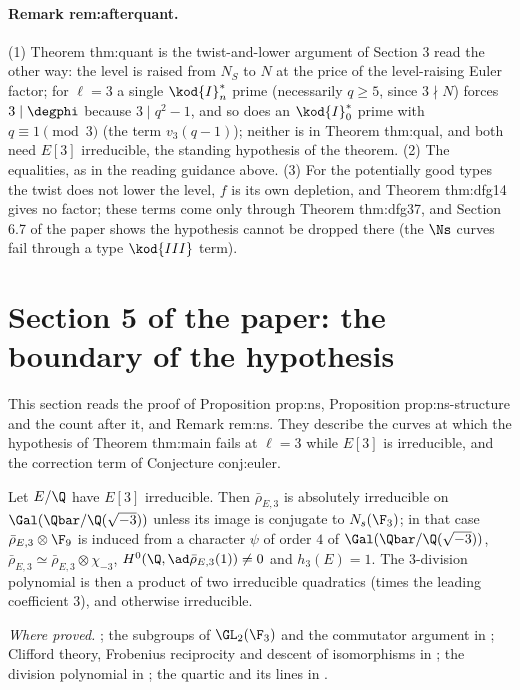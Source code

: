 \begin{sloppypar}
\paragraph{Remark rem:afterquant.} (1) Theorem thm:quant is the twist-and-lower argument of Section 3 read the other way: the level is raised from $N_S$ to $N$ at the price of
the level-raising Euler factor; for $\ell=3$ a single $\kod{I}_n^*$ prime (necessarily $q\ge5$, since $3\nmid N$) forces $3\mid\degphi$ because $3\mid q^2-1$, and so does an $\kod{I}_0^*$ prime with
$q\equiv1\pmod3$ (the term $v_3(q-1)$); neither is in Theorem thm:qual, and both need $E[3]$ irreducible, the standing hypothesis of the theorem. (2) The equalities, as in the reading
guidance above. (3) For the potentially good types the twist does not lower the level, $f$ is its own depletion, and Theorem thm:dfg14 gives no factor; these terms come only through
Theorem thm:dfg37, and Section 6.7 of the paper shows the hypothesis cannot be dropped there (the $\Ns$ curves fail through a type $\kod{III}$ term).

\section[Paper 5: the boundary]{Section 5 of the paper: the boundary of the hypothesis}\label{sec:paper:boundary}

This section reads the proof of Proposition prop:ns, Proposition prop:ns-structure and the count after it, and Remark rem:ns. They describe the curves at
which the hypothesis of Theorem thm:main fails at $\ell=3$ while $E[3]$ is irreducible, and the correction term of Conjecture conj:euler.

\begin{proposition}\label{prop:paper:ns}
Let $E/\Q$ have $E[3]$ irreducible. Then $\bar\rho_{E,3}$ is absolutely irreducible on $\Gal(\Qbar/\Q(\sqrt{-3}))$ unless its image is conjugate to $N_s(\F_3)$; in that case $\bar\rho_{E,3}\otimes\F_9$ is
induced from a character $\psi$ of order $4$ of $\Gal(\Qbar/\Q(\sqrt{-3}))$, $\bar\rho_{E,3}\simeq\bar\rho_{E,3}\otimes\chi_{-3}$, $H^0(\Q,\ad\bar\rho_{E,3}(1))\ne0$ and $h_3(E)=1$. The $3$-division polynomial is then a
product of two irreducible quadratics (times the leading coefficient $3$), and otherwise irreducible.
\end{proposition}

\noindent\emph{Where proved.} ; the subgroups of $\GL_2(\F_3)$ and the commutator argument in ; Clifford theory, Frobenius reciprocity and
descent of isomorphisms in ; the division polynomial in ; the quartic and its lines in .


\end{sloppypar}
